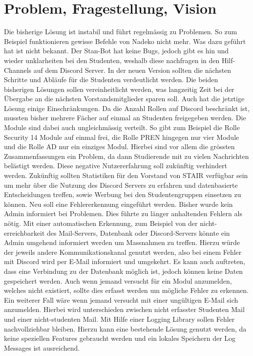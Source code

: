 \documentclass[a4paper, table]{article}
\begin{document}
\section{Problem, Fragestellung, Vision}
Die bisherige Lösung ist instabil und führt regelmässig zu Problemen.
So zum Beispiel funktionieren gewisse Befehle von Nadeko nicht mehr.
Was dazu geführt hat ist nicht bekannt.
Der Stan-Bot hat keine Bugs, jedoch gibt es hin und wieder unklarheiten bei den Studenten,
weshalb diese nachfragen in den Hilf-Channels auf dem Discord Server.
In der neuen Version sollten die nächsten Schritte und Abläufe für die Studenten verdeutlicht werden.
\newline
Die beiden bisherigen Lösungen sollen vereinheitlicht werden, was langzeitig Zeit bei der Übergabe an die nächsten Vorstandsmitglieder sparen soll.
Auch hat die jetztige Lösung einige Einschränkungen.
Da die Anzahl Rollen auf Discord beschränkt ist, mussten bisher mehrere Fächer auf einmal an Studenten freigegeben werden.
Die Module sind dabei auch ungleichmässig verteilt.
So gibt zum Beispiel die Rolle Security 14 Module auf einmal frei, die Rolle PREN hingegen nur vier Module und die Rolle AD nur ein einziges Modul.
Hierbei sind vor allem die grössten Zusammenfassungen ein Problem, da dann Studierende mit zu vielen Nachrichten belästigt werden.
Diese negative Nutzererfahrung soll zukünftig verhindert werden.
\newline
Zukünftig sollten Statistiken für den Vorstand von STAIR verfügbar sein um mehr über die Nutzung des Discord Servers zu erfahren
und datenbasierte Entscheidungen treffen, sowie Werbung bei den Studentengruppen einsetzen zu können.
\newline
Neu soll eine Fehlererkennung eingeführt werden.
Bisher wurde kein Admin informiert bei Problemen.
Dies führte zu länger anhaltenden Fehlern als nötig.
Mit einer automatischen Erkennung, zum Beispiel von der nicht-erreichbarkeit des Mail-Servers, Datenbank oder Discord-Servers könnte ein Admin umgehend informiert werden um Massnahmen zu treffen.
Hierzu würde der jeweils andere Kommunikationskanal genutzt werden, also bei einem Fehler mit Discord wird per E-Mail informiert und umgekehrt.
Es kann auch auftreten, dass eine Verbindung zu der Datenbank möglich ist, jedoch können keine Daten gespeichert werden.
Auch wenn jemand versucht für ein Modul anzumelden, welches nicht existiert, sollte dies erfasst werden um mögliche Fehler zu erkennen.
Ein weiterer Fall wäre wenn jemand versucht mit einer ungültigen E-Mail sich anzumelden.
Hierbei wird unterschieden zwischen nicht erfasster Studenten Mail und einer nicht-studenten Mail.
Mit Hilfe einer Logging Library sollen Fehler nachvollziehbar bleiben.
Hierzu kann eine bestehende Lösung genutzt werden, da keine speziellen Features gebraucht werden
und ein lokales Speichern der Log Messages ist ausreichend.
\end{document}
